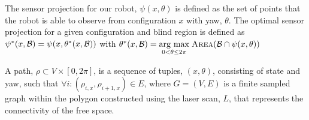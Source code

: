 \begin{definition}

    The sensor projection for our robot, $\psi(x, \theta)$ is defined as the
    set of points that the robot is able to observe from configuration $x$ with
    yaw, $\theta$. The optimal sensor projection for a given configuration and
    blind region is defined as $\psi^*(x, {{\mathcal{B}}}) = \psi(x, \theta^*(x, {{\mathcal{B}}}))$ with
    $\theta^*(x, {{\mathcal{B}}}) = \underset{0 < \theta \leq 2\pi}{\operatorname{arg}\,\operatorname{max}}\; {\textsc{Area}}({{\mathcal{B}}} \cap \psi(x,
    \theta))$

\end{definition}

\begin{definition}

    A path, $\rho \subset V \times [0, 2 \pi]$, is a sequence of tuples, $(x,
    \theta)$, consisting of state and yaw, such that $\forall
    i : (\rho_{i, x}, \rho_{i + 1, x}) \in E$, where $G = (V, E)$ is a finite
    sampled graph within the polygon constructed using the laser scan, $L$,
    that represents the connectivity of the free space.

\end{definition}

